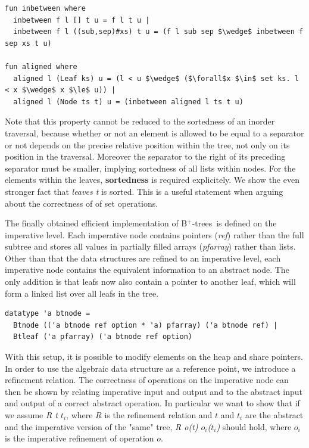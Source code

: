 \documentclass[a4paper,UKenglish,cleveref, autoref, thm-restate]{lipics-v2021}
\newcommand{\btrees}{B$^+$-trees}
\begin{document}
\begin{lstlisting}[mathescape=true, language=Isabelle,label=lst:btree-alignment-def]
fun inbetween where
  inbetween f l [] t u = f l t u |
  inbetween f l ((sub,sep)#xs) t u = (f l sub sep $\wedge$ inbetween f sep xs t u)

fun aligned where
  aligned l (Leaf ks) u = (l < u $\wedge$ ($\forall$x $\in$ set ks. l < x $\wedge$ x $\le$ u)) |
  aligned l (Node ts t) u = (inbetween aligned l ts t u)
\end{lstlisting}


Note that this property cannot be reduced to the sortedness of an inorder traversal,
because whether or not an element is allowed to be equal to a separator or not
depends on the precise relative position within the tree, not only on its position in the traversal.
Moreover the separator to the right of its preceding separator must be smaller,
implying sortedness of all lists within nodes.
For the elements within the leaves, \textbf{sortedness} is required explicitely.
We show the even stronger fact that \emph{leaves t} is sorted.
This is a useful statement when arguing about the correctness of of set operations.

The finally obtained efficient implementation of \btrees\ is defined
on the imperative level.
Each imperative node contains pointers (\emph{ref}) rather than the full subtree and
stores all values in partially filled arrays (\emph{pfarray}) rather than lists.
Other than that the data structures are refined to an imperative level,
each imperative node contains the equivalent information to an abstract node.
The only addition is that leafs now also contain a pointer to another leaf,
which will form a linked list over all leafs in the tree.

\begin{lstlisting}[mathescape=true, language=Isabelle,label=lst:btree-imp-def]
datatype 'a btnode =
  Btnode (('a btnode ref option * 'a) pfarray) ('a btnode ref) |
  Btleaf ('a pfarray) ('a btnode ref option)
\end{lstlisting}

With this setup, it is possible to modify elements on the heap and share pointers.
In order to use the algebraic data structure as a reference point,
we introduce a refinement relation.
The correctness of operations on the imperative node
can then be shown by relating imperative input and output
and to the abstract input and output of a correct abstract operation.
In particular we want to show that if we assume \emph{R t $t_i$},
where $R$ is the refinement relation and $t$ and $t_i$ are the abstract
and the imperative version of the "same" tree,
\emph{R o(t) $o_i$($t_i$)} should hold, where $o_i$ is the imperative refinement
of operation $o$.
\end{document}
